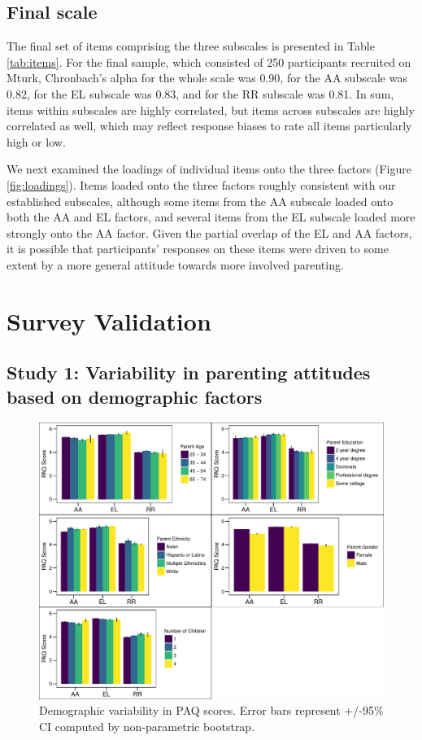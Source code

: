 \documentclass[floatsintext,man]{apa6}
\theoremstyle{definition}
\theoremstyle{definition}
\theoremstyle{definition}
\theoremstyle{remark}
\begin{document}
\subsection{Final scale}\label{final-scale}

The final set of items comprising the three subscales is presented in
Table \ref{tab:items}. For the final sample, which consisted of 250
participants recruited on Mturk, Chronbach's alpha for the whole scale
was 0.90, for the AA subscale was 0.82, for the EL subscale was 0.83,
and for the RR subscale was 0.81. In sum, items within subscales are
highly correlated, but items across subscales are highly correlated as
well, which may reflect response biases to rate all items particularly
high or low.

We next examined the loadings of individual items onto the three factors
(Figure \ref{fig:loadings}). Items loaded onto the three factors roughly
consistent with our established subscales, although some items from the
AA subscale loaded onto both the AA and EL factors, and several items
from the EL subscale loaded more strongly onto the AA factor. Given the
partial overlap of the EL and AA factors, it is possible that
participants' responses on these items were driven to some extent by a
more general attitude towards more involved parenting.

\section{Survey Validation}\label{survey-validation}

\subsection{Study 1: Variability in parenting attitudes based on
demographic
factors}\label{study-1-variability-in-parenting-attitudes-based-on-demographic-factors}

\begin{figure}
\centering
\includegraphics{PAQ_paper_files/figure-latex/demographics-1.pdf}
\caption{\label{fig:demographics}Demographic variability in PAQ scores.
Error bars represent +/-95\% CI computed by non-parametric bootstrap.}
\end{figure}
\end{document}
